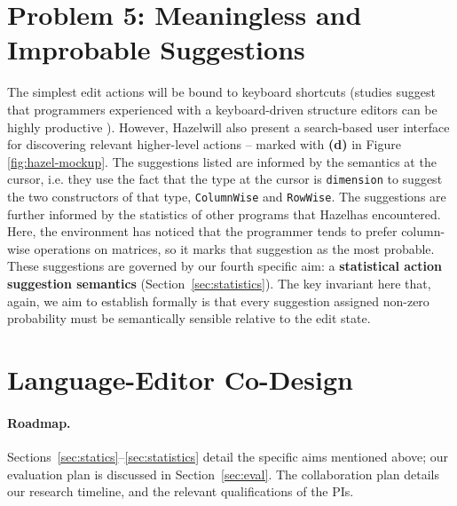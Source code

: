 \documentclass[letterpaper,USenglish]{lipics-v2016}
\let\li\lstinline
\newcommand{\Hazel}[0]{\textsf{Hazel}}
\newcommand{\HazelEnv}[0]{\Hazel}
\begin{document}
\section{Problem 5: Meaningless and Improbable Suggestions} 
The simplest 
edit actions will be bound to keyboard shortcuts (studies suggest that programmers experienced with a keyboard-driven structure editors can be highly productive \cite{DBLP:conf/vl/Asenov014}). However, \HazelEnv will 
also present a search-based user
interface for discovering relevant higher-level actions -- marked with \textbf{(d)} in Figure \ref{fig:hazel-mockup}. 
The suggestions 
listed are informed by the semantics at the cursor, i.e. they use the fact that
the type at the cursor is \li{dimension} to suggest the two constructors of that
type, \li{ColumnWise} and \li{RowWise}. The suggestions are further informed by
the statistics of other programs that \HazelEnv has encountered.  Here, the
environment has noticed that the programmer tends to prefer column-wise operations on 
matrices, so it marks that suggestion as the most probable. These suggestions are governed by
our fourth specific aim: a \textbf{statistical action suggestion semantics} (Section~\ref{sec:statistics}). The key invariant here that, again, we aim to establish 
formally is that every suggestion assigned non-zero probability must be semantically sensible 
relative to the edit state.%

\section{Language-Editor Co-Design}

\clearpage


\paragraph{Roadmap.} Sections~\ref{sec:statics}--\ref{sec:statistics} detail the
specific aims mentioned above; our evaluation plan is discussed in Section~\ref{sec:eval}.
The collaboration plan details our 
research timeline, and the relevant qualifications of the PIs.


\end{document}
